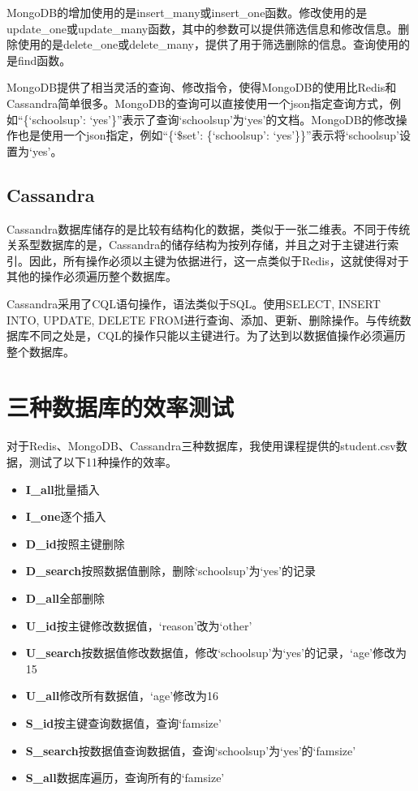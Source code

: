 \documentclass[12pt]{ctexart}
\begin{document}
MongoDB的增加使用的是insert\_many或insert\_one函数。修改使用的是update\_one或update\_many函数，其中的参数可以提供筛选信息和修改信息。删除使用的是delete\_one或delete\_many，提供了用于筛选删除的信息。查询使用的是find函数。

MongoDB提供了相当灵活的查询、修改指令，使得MongoDB的使用比Redis和Cassandra简单很多。MongoDB的查询可以直接使用一个json指定查询方式，例如``\{`schoolsup': `yes'\}''表示了查询`schoolsup'为`yes'的文档。MongoDB的修改操作也是使用一个json指定，例如``\{`\$set': \{`schoolsup': `yes'\}\}''表示将`schoolsup'设置为`yes'。

\subsection{Cassandra}

Cassandra数据库储存的是比较有结构化的数据，类似于一张二维表。不同于传统关系型数据库的是，Cassandra的储存结构为按列存储，并且之对于主键进行索引。因此，所有操作必须以主键为依据进行，这一点类似于Redis，这就使得对于其他的操作必须遍历整个数据库。

Cassandra采用了CQL语句操作，语法类似于SQL。使用SELECT, INSERT INTO, UPDATE, DELETE FROM进行查询、添加、更新、删除操作。与传统数据库不同之处是，CQL的操作只能以主键进行。为了达到以数据值操作必须遍历整个数据库。

\section{三种数据库的效率测试}

对于Redis、MongoDB、Cassandra三种数据库，我使用课程提供的student.csv数据，测试了以下11种操作的效率。

\begin{itemize}
    \itemsep0em
    \item \textbf{I\_all}批量插入
    \item \textbf{I\_one}逐个插入
    \item \textbf{D\_id}按照主键删除
    \item \textbf{D\_search}按照数据值删除，删除`schoolsup'为`yes'的记录
    \item \textbf{D\_all}全部删除
    \item \textbf{U\_id}按主键修改数据值，`reason'改为`other'
    \item \textbf{U\_search}按数据值修改数据值，修改`schoolsup'为`yes'的记录，`age'修改为15
    \item \textbf{U\_all}修改所有数据值，`age'修改为16
    \item \textbf{S\_id}按主键查询数据值，查询`famsize'
    \item \textbf{S\_search}按数据值查询数据值，查询`schoolsup'为`yes'的`famsize'
    \item \textbf{S\_all}数据库遍历，查询所有的`famsize'
\end{itemize}
\end{document}
